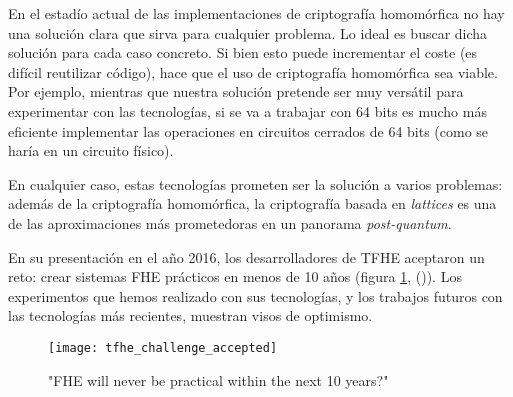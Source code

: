 En el estadío actual de las implementaciones de criptografía homomórfica no hay una solución clara que sirva para cualquier problema. Lo ideal es buscar dicha solución para cada caso concreto. Si bien esto puede incrementar el coste (es difícil reutilizar código), hace que el uso de criptografía homomórfica sea viable. Por ejemplo, mientras que nuestra solución pretende ser muy versátil para experimentar con las tecnologías, si se va a trabajar con 64 bits es mucho más eficiente implementar las operaciones en circuitos cerrados de 64 bits (como se haría en un circuito físico).

En cualquier caso, estas tecnologías prometen ser la solución a varios problemas: además de la criptografía homomórfica, la criptografía basada en \textit{lattices} es una de las aproximaciones más prometedoras en un panorama \textit{post-quantum}.

En su presentación en el año 2016, los desarrolladores de TFHE aceptaron un reto: crear sistemas FHE prácticos en menos de 10 años (figura \ref{fig:tfhe_challenge_accepted}, (\cite{chillotti_tfhe:_2016})). Los experimentos que hemos realizado con sus tecnologías, y los trabajos futuros con las tecnologías más recientes, muestran visos de optimismo.

\begin{figure}[h]
    \centering
    \texttt{[image: tfhe\_challenge\_accepted]}
    \caption{"FHE will never be practical within the next 10 years?"}
    \label{fig:tfhe_challenge_accepted}
\end{figure}
